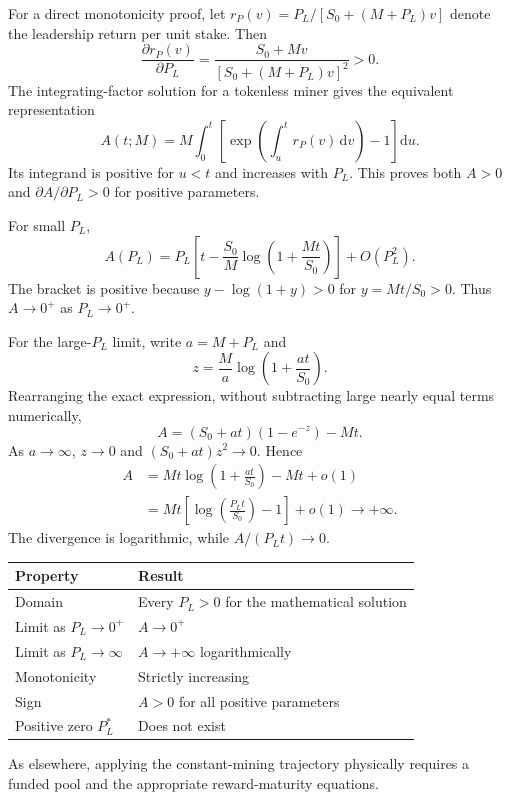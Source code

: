 \documentclass[11pt,a4paper]{article}
\newcommand{\rmd}{\mathrm{d}}
\begin{document}
For a direct monotonicity proof, let $r_P(v)=P_L/[S_0+(M+P_L)v]$ denote the leadership return per unit stake. Then
\begin{equation}
\frac{\partial r_P(v)}{\partial P_L}
=\frac{S_0+Mv}{[S_0+(M+P_L)v]^2}>0.
\end{equation}
The integrating-factor solution for a tokenless miner gives the equivalent representation
\begin{equation}
A(t;M)=M\int_0^t\left[\exp\!\left(\int_u^t r_P(v)\,\rmd v\right)-1\right]\rmd u.
\end{equation}
Its integrand is positive for $u<t$ and increases with $P_L$. This proves both $A>0$ and $\partial A/\partial P_L>0$ for positive parameters.

For small $P_L$,
\begin{equation}
A(P_L)=P_L\left[t-\frac{S_0}{M}\log\left(1+\frac{Mt}{S_0}\right)\right]+O(P_L^2).
\end{equation}
The bracket is positive because $y-\log(1+y)>0$ for $y=Mt/S_0>0$. Thus $A\to0^+$ as $P_L\to0^+$.

For the large-$P_L$ limit, write $a=M+P_L$ and
\begin{equation}
z=\frac{M}{a}\log\left(1+\frac{at}{S_0}\right).
\end{equation}
Rearranging the exact expression, without subtracting large nearly equal terms numerically,
\begin{equation}
A=(S_0+at)(1-e^{-z})-Mt.
\end{equation}
As $a\to\infty$, $z\to0$ and $(S_0+at)z^2\to0$. Hence
\begin{align}
A&=Mt\log\left(1+\frac{at}{S_0}\right)-Mt+o(1)\\
 &=Mt\left[\log\left(\frac{P_Lt}{S_0}\right)-1\right]+o(1)
 \longrightarrow+\infty.
\end{align}
The divergence is logarithmic, while $A/(P_Lt)\to0$.

\begin{center}
\small
\begin{tabularx}{\linewidth}{@{}YY@{}}
\toprule
Property & Result\\
\midrule
Domain & Every $P_L>0$ for the mathematical solution\\
Limit as $P_L\to0^+$ & $A\to0^+$\\
Limit as $P_L\to\infty$ & $A\to+\infty$ logarithmically\\
Monotonicity & Strictly increasing\\
Sign & $A>0$ for all positive parameters\\
Positive zero $P_L^*$ & Does not exist\\
\bottomrule
\end{tabularx}
\end{center}
As elsewhere, applying the constant-mining trajectory physically requires a funded pool and the appropriate reward-maturity equations.
\end{document}
